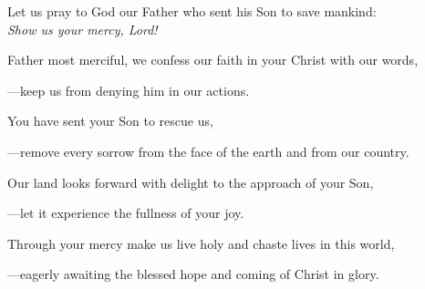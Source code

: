 \intercessions\indent

\begin{hangpar}

Let us pray to God our Father who sent his Son to save mankind:\\
\emph{Show us your mercy, Lord!}

\medskip Father most merciful, we confess our faith in your Christ with our words,

{\color{red}---\thinspace}keep us from denying him in our actions.

\medskip You have sent your Son to rescue us,

{\color{red}---\thinspace}remove every sorrow from the face of the earth and from our country.

\medskip Our land looks forward with delight to the approach of your Son,

{\color{red}---\thinspace}let it experience the fullness of your joy.

\medskip Through your mercy make us live holy and chaste lives in this world,

{\color{red}---\thinspace}eagerly awaiting the blessed hope and coming of Christ in glory.

\medskip

\end{hangpar}